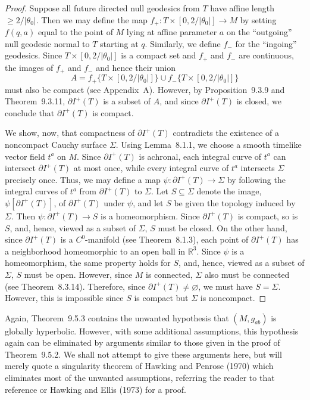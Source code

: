 \begin{proof}
Suppose all future directed null geodesics from \(T\) have affine length
\(\geq2/\lvert\theta_0\rvert\). Then we may define the map
\(f_+:T\times[0,2/\lvert\theta_0\rvert]\longrightarrow M\) by setting \(f(q,a)\)
equal to the point of \(M\) lying at affine parameter \(a\) on the ``outgoing'' null
geodesic normal to \(T\) starting at \(q\). Similarly, we define \(f_-\) for the
``ingoing'' geodesics. Since \(T\times[0,2/\lvert\theta_0\rvert]\) is a compact set
and \(f_+\) and \(f_-\) are continuous, the images of \(f_+\) and \(f_-\) and hence
their union
\[
  A=f_+\bigl\{T\times[0,2/\lvert\theta_0\rvert]\bigr\}
    \cup f_-\bigl\{T\times[0,2/\lvert\theta_0\rvert]\bigr\}
\]
must also be compact (see Appendix~A). However, by Proposition~9.3.9 and
Theorem~9.3.11, \(\partial I^+(T)\) is a subset of \(A\), and since
\(\partial I^+(T)\) is closed, we conclude that \(\partial I^+(T)\) is compact.

We show, now, that compactness of \(\partial I^+(T)\) contradicts the existence of a
noncompact Cauchy surface \(\Sigma\). Using Lemma~8.1.1, we choose a smooth timelike
vector field \(t^a\) on \(M\). Since \(\partial I^+(T)\) is achronal, each integral
curve of \(t^a\) can intersect \(\partial I^+(T)\) at most once, while every integral
curve of \(t^a\) intersects \(\Sigma\) precisely once. Thus, we may define a map
\(\psi:\partial I^+(T)\longrightarrow\Sigma\) by following the integral curves of
\(t^a\) from \(\partial I^+(T)\) to \(\Sigma\). Let \(S\subseteq\Sigma\) denote the
image, \(\psi[\partial I^+(T)]\), of \(\partial I^+(T)\) under \(\psi\), and let \(S\)
be given the topology induced by \(\Sigma\). Then
\(\psi:\partial I^+(T)\longrightarrow S\) is a homeomorphism. Since
\(\partial I^+(T)\) is compact, so is \(S\), and, hence, viewed as a subset of
\(\Sigma\), \(S\) must be closed. On the other hand, since \(\partial I^+(T)\) is a
\(C^0\)-manifold (see Theorem~8.1.3), each point of \(\partial I^+(T)\) has a
neighborhood homeomorphic to an open ball in \(\mathbb R^3\). Since \(\psi\) is a
homeomorphism, the same property holds for \(S\), and, hence, viewed as a subset of
\(\Sigma\), \(S\) must be open. However, since \(M\) is connected, \(\Sigma\) also
must be connected (see Theorem~8.3.14). Therefore, since
\(\partial I^+(T)\ne\varnothing\), we must have \(S=\Sigma\). However, this is
impossible since \(S\) is compact but \(\Sigma\) is noncompact.
\end{proof}

Again, Theorem~9.5.3 contains the unwanted hypothesis that \((M,g_{ab})\) is
globally hyperbolic. However, with some additional assumptions, this hypothesis
again can be eliminated by arguments similar to those given in the proof of
Theorem~9.5.2. We shall not attempt to give these arguments here, but will merely
quote a singularity theorem of Hawking and Penrose (1970) which eliminates most of
the unwanted assumptions, referring the reader to that reference or Hawking and
Ellis (1973) for a proof.

